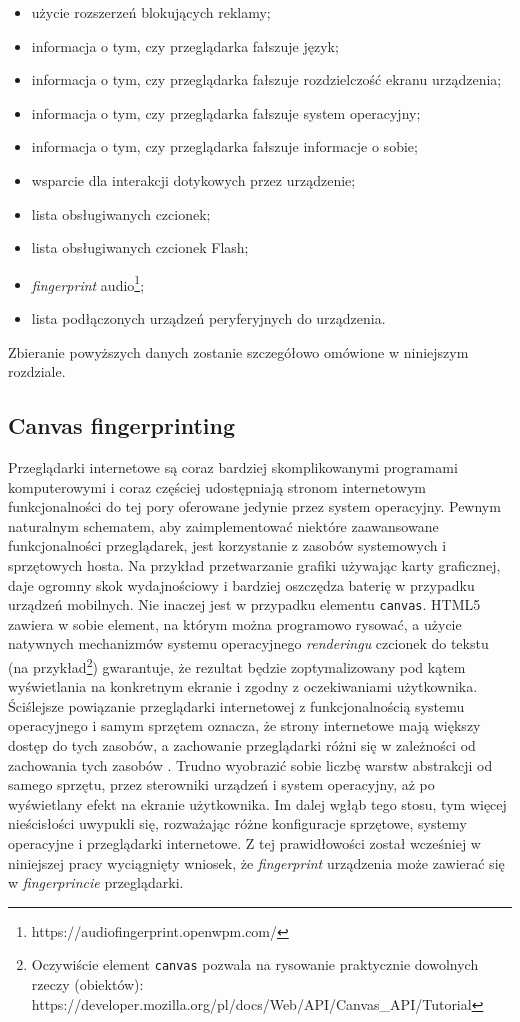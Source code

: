 \begin{itemize}
	\item użycie rozszerzeń blokujących reklamy;
	\item informacja o tym, czy przeglądarka fałszuje język;
	\item informacja o tym, czy przeglądarka fałszuje rozdzielczość ekranu
	      urządzenia;
	\item informacja o tym, czy przeglądarka fałszuje system operacyjny;
	\item informacja o tym, czy przeglądarka fałszuje informacje o sobie;
	\item wsparcie dla interakcji dotykowych przez urządzenie;
	\item lista obsługiwanych czcionek;
	\item lista obsługiwanych czcionek Flash;
	\item \emph{fingerprint}
	      audio\footnote{https://audiofingerprint.openwpm.com/};
	\item lista podłączonych urządzeń peryferyjnych do urządzenia.
\end{itemize}

Zbieranie powyższych danych zostanie szczegółowo omówione w niniejszym
rozdziale.

\subsection{Canvas fingerprinting}
Przeglądarki internetowe są coraz bardziej skomplikowanymi programami
komputerowymi i coraz częściej udostępniają stronom internetowym funkcjonalności
do tej pory oferowane jedynie przez system operacyjny. Pewnym naturalnym
schematem, aby zaimplementować niektóre zaawansowane funkcjonalności
przeglądarek, jest korzystanie z zasobów systemowych i sprzętowych hosta. Na
przykład przetwarzanie grafiki używając karty graficznej, daje ogromny skok
wydajnościowy i bardziej oszczędza baterię w przypadku urządzeń mobilnych. Nie
inaczej jest w przypadku elementu \texttt{canvas}. HTML5 zawiera w sobie
element, na którym można programowo rysować, a użycie natywnych mechanizmów
systemu operacyjnego \emph{renderingu} czcionek do tekstu (na
przykład\footnote{Oczywiście element \texttt{canvas} pozwala na rysowanie
	praktycznie dowolnych rzeczy (obiektów):
	https://developer.mozilla.org/pl/docs/Web/API/Canvas\_API/Tutorial})
gwarantuje, że rezultat będzie zoptymalizowany pod kątem wyświetlania na
konkretnym ekranie i zgodny z oczekiwaniami użytkownika. Ściślejsze powiązanie
przeglądarki internetowej z funkcjonalnością systemu operacyjnego i samym
sprzętem oznacza, że strony internetowe mają większy dostęp do tych zasobów, a
zachowanie przeglądarki różni się w zależności od zachowania tych zasobów
\cite[s. 1]{mowery2012pixel}. Trudno wyobrazić sobie liczbę warstw abstrakcji od
samego sprzętu, przez sterowniki urządzeń i system operacyjny, aż po wyświetlany
efekt na ekranie użytkownika. Im dalej wgłąb tego stosu, tym więcej nieścisłości
uwypukli się, rozważając różne konfiguracje sprzętowe, systemy operacyjne i
przeglądarki internetowe. Z tej prawidłowości został wcześniej w niniejszej
pracy wyciągnięty wniosek, że \emph{fingerprint} urządzenia może zawierać się w
\emph{fingerprincie} przeglądarki.

